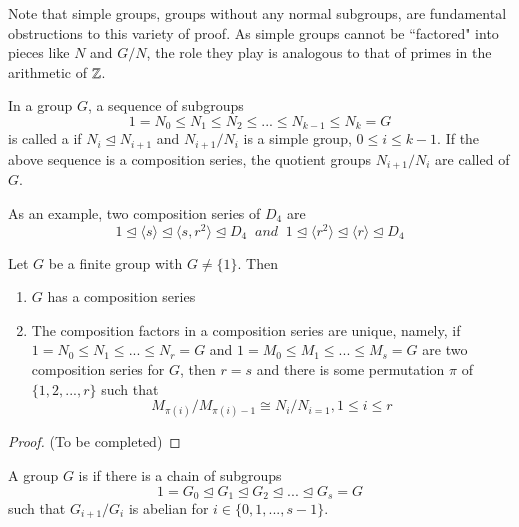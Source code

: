 Note that simple groups, groups without any normal subgroups, are fundamental obstructions to this variety of proof. As simple groups cannot be ``factored" into pieces like $N$ and $G/N$, the role they play is analogous to that of primes in the arithmetic of $\mathbb Z$. 

\begin{defn}
    In a group $G$, a sequence of subgroups \begin{equation*}
        1 = N_0 \leq N_1 \leq N_2 \leq ... \leq N_{k-1} \leq N_k = G
    \end{equation*}
    is called a  if $N_i \trianglelefteq N_{i+1}$ and $N_{i+1}/N_i$ is a simple group, $0 \leq i \leq k-1$. If the above sequence is a composition series, the quotient groups $N_{i+1}/N_i$ are called  of $G$.
\end{defn}

As an example, two composition series of $D_4$ are \begin{equation*}
    1\trianglelefteq \langle s \rangle \trianglelefteq \langle s,r^2\rangle \trianglelefteq D_4\;\;and\;\;1 \trianglelefteq \langle r^2\rangle \trianglelefteq \langle r \rangle \trianglelefteq D_4
\end{equation*}


\begin{namthm}\label{thmname:JHseries}
    Let $G$ be a finite group with $G \neq \{1\}$. Then \begin{enumerate}
        \item $G$ has a composition series
        \item The composition factors in a composition series are unique, namely, if $1 = N_0 \leq N_1 \leq ... \leq N_r = G$ and $1 = M_0 \leq M_1 \leq ... \leq M_s = G$ are two composition series for $G$, then $r = s$ and there is some permutation $\pi$ of $\{1,2,...,r\}$ such that \begin{equation*}
                M_{\pi(i)}/M_{\pi(i)-1}\cong N_i/N_{i=1}, 1 \leq i \leq r
        \end{equation*}
    \end{enumerate}
\end{namthm}
\begin{proof}
    (To be completed)
\end{proof}


\begin{defn}
    A group $G$ is  if there is a chain of subgroups \begin{equation*}
        1 = G_0 \trianglelefteq G_1 \trianglelefteq G_2 \trianglelefteq ... \trianglelefteq G_s = G
    \end{equation*}
    such that $G_{i+1}/G_i$ is abelian for $i \in \{0,1,...,s-1\}$.
\end{defn}

